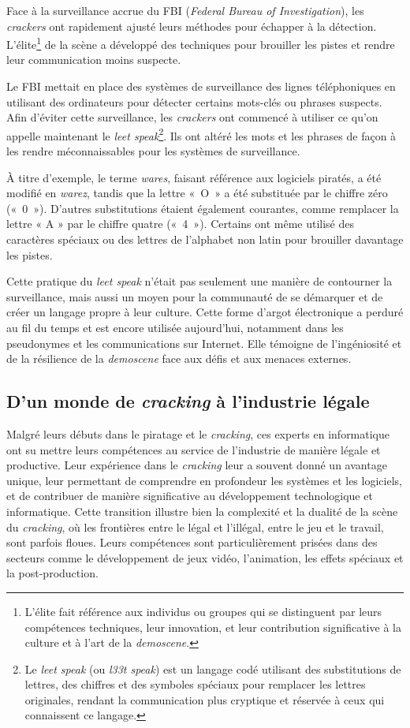Face à la surveillance accrue du FBI (\textit{Federal Bureau of Investigation}), les \textit{crackers} ont rapidement ajusté leurs méthodes pour échapper à la détection. L'élite\footnote{L'élite fait référence aux individus ou groupes qui se distinguent par leurs compétences techniques, leur innovation, et leur contribution significative à la culture et à l'art de la \textit{demoscene}.} de la scène a développé des techniques pour brouiller les pistes et rendre leur communication moins suspecte.

Le FBI mettait en place des systèmes de surveillance des lignes téléphoniques en utilisant des ordinateurs pour détecter certains mots-clés ou phrases suspects. Afin d'éviter cette surveillance, les \textit{crackers} ont commencé à utiliser ce qu'on appelle maintenant le \textit{leet speak}\footnote{Le \textit{leet speak} (ou \textit{l33t speak}) est un langage codé utilisant des substitutions de lettres, des chiffres et des symboles spéciaux pour remplacer les lettres originales, rendant la communication plus cryptique et réservée à ceux qui connaissent ce langage.}. Ils ont altéré les mots et les phrases de façon à les rendre méconnaissables pour les systèmes de surveillance.

À titre d'exemple, le terme \textit{wares}, faisant référence aux logiciels piratés, a été modifié en \textit{warez}, tandis que la lettre «~O~» a été substituée par le chiffre zéro («~0~»). D'autres substitutions étaient également courantes, comme remplacer la lettre « A » par le chiffre quatre («~4~»). Certains ont même utilisé des caractères spéciaux ou des lettres de l'alphabet non latin pour brouiller davantage les pistes.

Cette pratique du \textit{leet speak} n'était pas seulement une manière de contourner la surveillance, mais aussi un moyen pour la communauté de se démarquer et de créer un langage propre à leur culture. Cette forme d'argot électronique a perduré au fil du temps et est encore utilisée aujourd'hui, notamment dans les pseudonymes et les communications sur Internet. Elle témoigne de l'ingéniosité et de la résilience de la \textit{demoscene} face aux défis et aux menaces externes.

\subsection*{D'un monde de \textit{cracking} à l'industrie légale}

Malgré leurs débuts dans le piratage et le \textit{cracking}, ces experts en informatique ont su mettre leurs compétences au service de l'industrie de manière légale et productive. Leur expérience dans le \textit{cracking} leur a souvent donné un avantage unique, leur permettant de comprendre en profondeur les systèmes et les logiciels, et de contribuer de manière significative au développement technologique et informatique. Cette transition illustre bien la complexité et la dualité de la scène du \textit{cracking}, où les frontières entre le légal et l'illégal, entre le jeu et le travail, sont parfois floues. Leurs compétences sont particulièrement prisées dans des secteurs comme le développement de jeux vidéo, l'animation, les effets spéciaux et la post-production.

